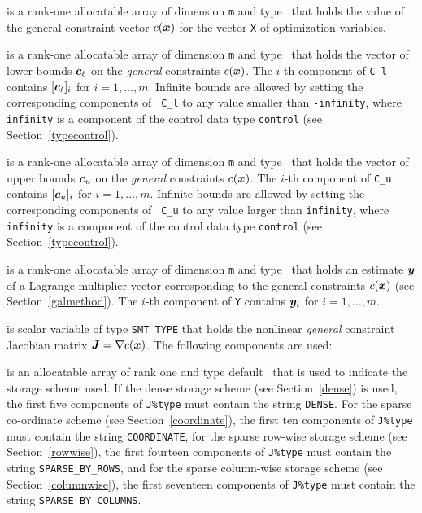 \documentclass{galahad}
\newcommand{\Grad}{\nabla}
\begin{document}
\begin{description}
\begin{description}
\end{description}

 is a rank-one allocatable array of dimension {\tt m}
and type \realdp\ that holds the value of the general
constraint vector $c({\bm{x}})$ for the vector {\tt X} of optimization variables. 

 is a rank-one allocatable array of dimension {\tt m}
and type \realdp\ that holds the vector of lower bounds
${\bm{c}}_\ell$ on the {\em general} constraints $c({\bm{x}})$. The $i$-th component of
{\tt C\_l} contains $[{\bm{c}}_\ell]_i$ for $i = 1, \ldots , m$.  Infinite
bounds are allowed by setting the corresponding components of {\tt
  C\_l} to any value smaller than {\tt -infinity}, where {\tt
  infinity} is a component of the control data type {\tt control} (see
Section~\ref{typecontrol}).

  is a rank-one allocatable array of dimension {\tt m}
and type \realdp\ that holds the vector of upper bounds
${\bm{c}}_u$ on the {\em general} constraints $c({\bm{x}})$. The $i$-th component of
{\tt C\_u} contains $[{\bm{c}}_u]_i$ for $i = 1, \ldots , m$.  Infinite
bounds are allowed by setting the corresponding components of {\tt
  C\_u} to any value larger than {\tt infinity}, where {\tt
  infinity} is a component of the control data type {\tt control} (see
Section~\ref{typecontrol}).

 is a rank-one allocatable array of dimension {\tt m} and type 
\realdp\ that holds an estimate ${\bm{y}}$ of a Lagrange
multiplier vector corresponding to the general constraints $c({\bm{x}})$ (see Section~\ref{galmethod}).
The $i$-th component of {\tt Y} contains ${\bm{y}}_{i}$ for $i = 1,  \ldots , m$.


 is scalar variable of type {\tt SMT\_TYPE} that holds the
nonlinear {\em general} constraint Jacobian matrix $\bmJ = \Grad c(\bmx)$. The
following components are used:

\begin{description}

 is an allocatable array of rank one and type default 
\character\ that
is used to indicate the storage scheme used. If the dense storage scheme 
(see Section~\ref{dense}) is used, 
the first five components of {\tt J\%type} must contain the
string {\tt DENSE}.
For the sparse co-ordinate scheme (see Section~\ref{coordinate}), 
the first ten components of {\tt J\%type} must contain the
string {\tt COORDINATE},  
for the sparse row-wise storage scheme (see Section~\ref{rowwise}),
the first fourteen components of {\tt J\%type} must contain the
string {\tt SPARSE\_BY\_ROWS},
and for the sparse column-wise storage scheme (see Section~\ref{columnwise}),
the first seventeen components of {\tt J\%type} must contain the
string {\tt SPARSE\_BY\_COLUMNS}.


\end{description}
\end{description}
\end{document}
